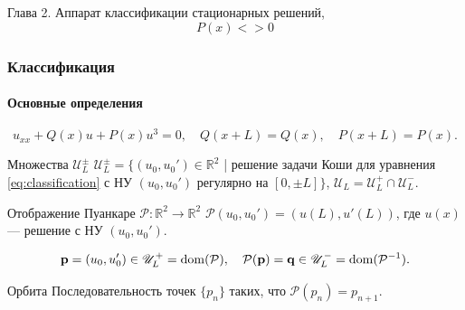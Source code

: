 \documentclass [10pt] {beamer}
\begin{document}
\begin{frame}
	\begin{center}
		{\LARGE Глава 2. Аппарат классификации стационарных решений, $$P(x) <> 0$$}
	\end{center}
\end{frame}

\begin{frame}
	\frametitle{Классификация}
	\framesubtitle{Основные определения}
	
	\begin{equation}
		u_{xx} + Q(x) u + P(x) u^3 = 0, \quad Q(x + L) = Q(x), \quad P(x + L) = P(x).
		\label{eq:classification}
	\end{equation}

	\begin{block}{Множества $\mathscr{U}_L^{\pm}$}
	$\mathscr{U}_L^{\pm} = \{ (u_0, u_0') \in \mathbb{R}^2$ | решение задачи Коши для уравнения \eqref{eq:classification} с НУ $(u_0, u_0')$ регулярно на $[0, {\pm} L] \}$, $\mathscr{U}_L = \mathscr{U}_L^+ \cap \mathscr{U}_L^-$.
	\end{block}

	\begin{block}{Отображение Пуанкаре $\mathcal{P}: \mathbb{R}^2 \to \mathbb{R}^2$}
		$\mathcal{P} (u_0,u_0') = (u(L), u'(L))$, где $u(x)$ --- решение с НУ $(u_0, u_0')$.
	\end{block}

	$$\vb{p} = (u_0, u_0') \in \mathscr{U}_L^+ = \mathrm{dom}(\mathcal{P}), \quad \mathcal{P}(\vb{p}) = \vb{q} \in \mathscr{U}_L^- = \mathrm{dom}(\mathcal{P}^{-1}).$$

	\begin{block}{Орбита}
		Последовательность точек $\{ p_n \}$ таких, что $\mathcal{P}(p_n) = p_{n+1}$.
	\end{block}
\end{frame}
\end{document}
